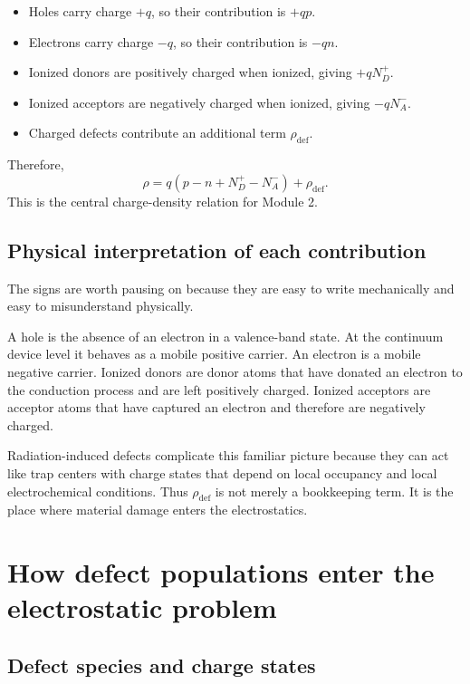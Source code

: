 \documentclass[11pt]{article}
\begin{document}
\begin{itemize}
    \item Holes carry charge $+q$, so their contribution is $+q p$.
    \item Electrons carry charge $-q$, so their contribution is $-q n$.
    \item Ionized donors are positively charged when ionized, giving $+q N_D^+$.
    \item Ionized acceptors are negatively charged when ionized, giving $-q N_A^-$.
    \item Charged defects contribute an additional term $\rho_{\mathrm{def}}$.
\end{itemize}

Therefore,
\begin{equation}
\rho = q(p - n + N_D^+ - N_A^-) + \rho_{\mathrm{def}}.
\end{equation}
This is the central charge-density relation for Module 2.

\subsection{Physical interpretation of each contribution}

The signs are worth pausing on because they are easy to write mechanically and easy to misunderstand physically.

A hole is the absence of an electron in a valence-band state. At the continuum device level it behaves as a mobile positive carrier. An electron is a mobile negative carrier. Ionized donors are donor atoms that have donated an electron to the conduction process and are left positively charged. Ionized acceptors are acceptor atoms that have captured an electron and therefore are negatively charged.

Radiation-induced defects complicate this familiar picture because they can act like trap centers with charge states that depend on local occupancy and local electrochemical conditions. Thus $\rho_{\mathrm{def}}$ is not merely a bookkeeping term. It is the place where material damage enters the electrostatics.

\section{How defect populations enter the electrostatic problem}

\subsection{Defect species and charge states}
\end{document}
